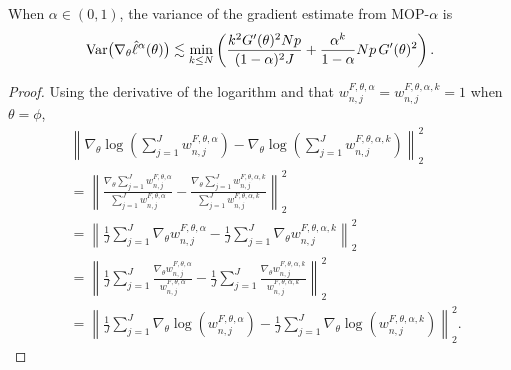 \begin{thm}
    When $\alpha \in (0,1)$, the variance of the gradient estimate from MOP-$\alpha$ is
    \begin{equation}\mathrm{Var}\big(\nabla_\theta \hat\ell^\alpha(\theta)\big) \lesssim \min_{k\leq N} \left(\frac{k^2G'(\theta)^2Np}{(1-\alpha)^2J} + \frac{\alpha^{k}}{1-\alpha}Np \, G'(\theta)^2 \right).
    \end{equation}
\end{thm}
\begin{proof}
    
Using the derivative of the logarithm and that $w_{n,j}^{F,\theta,\alpha} = w_{n,j}^{F,\theta,\alpha,k} = 1$ when $\theta=\phi$,
\begin{align}
    &\left\lVert\nabla_\theta\log\left(\sum_{j=1}^J w_{n,j}^{F,\theta,\alpha}\right)-\nabla_\theta\log\left(\sum_{j=1}^J w_{n,j}^{F,\theta,\alpha,k}\right)\right\rVert_2^2\\
    &= \left\lVert\frac{\nabla_\theta\sum_{j=1}^J w_{n,j}^{F,\theta,\alpha}}{{\sum_{j=1}^J w_{n,j}^{F,\theta,\alpha}}}-\frac{\nabla_\theta\sum_{j=1}^J w_{n,j}^{F,\theta,\alpha,k}}{{\sum_{j=1}^J w_{n,j}^{F,\theta,\alpha,k}}}\right\rVert_2^2 \\
    &= \left\lVert\frac{1}{J}\sum_{j=1}^J \nabla_\theta w_{n,j}^{F,\theta,\alpha}-\frac{1}{J}\sum_{j=1}^J \nabla_\theta w_{n,j}^{F,\theta,\alpha,k}\right\rVert_2^2 \\
    &= \left\lVert\frac{1}{J}\sum_{j=1}^J \frac{\nabla_\theta w_{n,j}^{F,\theta,\alpha}}{w_{n,j}^{F,\theta,\alpha}}-\frac{1}{J}\sum_{j=1}^J \frac{\nabla_\theta w_{n,j}^{F,\theta,\alpha,k}}{w_{n,j}^{F,\theta,\alpha,k}}\right\rVert_2^2\\
    &= \left\lVert\frac{1}{J}\sum_{j=1}^J \nabla_\theta \log\left(w_{n,j}^{F,\theta,\alpha}\right)-\frac{1}{J}\sum_{j=1}^J \nabla_\theta \log\left(w_{n,j}^{F,\theta,\alpha,k}\right)\right\rVert_2^2.
\end{align}


\end{proof}

